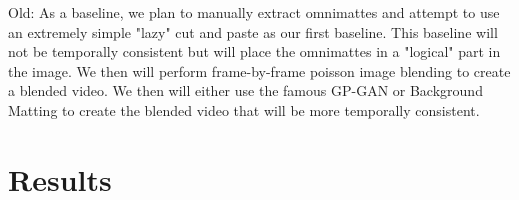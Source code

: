 \documentclass{article}
\begin{document}
Old:
As a baseline, we plan to manually extract omnimattes and attempt to use an extremely simple "lazy" cut and paste as our first baseline. This baseline will not be temporally consistent but will place the omnimattes in a "logical" part in the image. We then will perform frame-by-frame poisson image blending to create a blended video. We then will either use the famous GP-GAN\cite{10.1145/3343031.3350944} or Background Matting \cite{BMSengupta20} to create the blended video that will be more temporally consistent.

\section{Results}


\printbibliography
\end{document}
